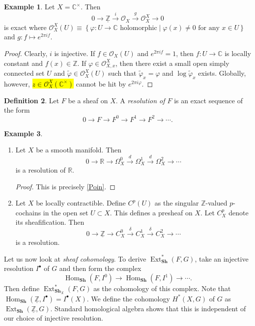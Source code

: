 \documentclass[10pt,letterpaper,cm]{nupset}
\theoremstyle{definition}
\newtheorem{definition}{Definition}[subsection]
\newtheorem{exmp}[definition]{Example}
\theoremstyle{theorem}
\theoremstyle{remark}
\newcommand{\C}{\mathbb C}
\newcommand{\R}{\mathbb{R}}
\newcommand{\Z}{\mathbb Z}
\newcommand{\1}{\mathbb{1}}
\newcommand{\0}{\vec 0}
\DeclareMathOperator{\ext}{Ext}
\DeclareMathOperator{\Hom}{Hom}
\begin{document}
\begin{exmp}
 Let $X = \C^{\times}$. Then $$ 0 \to \underline{\Z} \overset{i}{\longrightarrow} \mathcal{O}_X \overset{g}{\longrightarrow} \mathcal{O}_X^X \to 0$$ is exact where $\mathcal{O}_X^X(U) \equiv \left\{ \varphi : U \to \C \text{ holomorphic} \mid \varphi(x) \ne 0 \text{ for any } x\in U\right\}$ and $g : f \mapsto e^{2\pi i f}$.
\end{exmp}
\begin{proof}
Clearly, $i$ is injective. If $f \in \mathcal{O}_X(U)$ and $e^{2\pi i f} =1$, then $f : U \to \C$ is locally constant and $f(x) \in \Z$. If $\varphi \in \mathcal{O}_{X,x}^X$, then there exist a small open simply connected set $U$ and $\tilde{\varphi} \in \mathcal{O}_X^X(U)$ such that $\tilde{\varphi}_x = \varphi$ and $\log{\tilde{\varphi}_x}$ exists. Globally, however, \hl{$z\in \mathcal{O}_X^X(\C^{\times})$} cannot be hit by $e^{2\pi i \varphi}$.
\end{proof}

\begin{definition}
Let $F$ be a sheaf on $X$. A \textit{resolution of $F$} is an exact sequence of the form $$0 \to F \to F^0 \to F^1 \to F^2 \to \cdots .$$
\end{definition}

\pagebreak

\begin{exmp} $ $
\begin{enumerate}
\item Let $X$ be a smooth manifold. Then $$0 \to \R \to \Omega_X^0 \overset{d}{\longrightarrow} \Omega_X^1 \overset{d}{\longrightarrow} \Omega^2_X \to \cdots$$ is a resolution of $\R$.
\begin{proof}
This is precisely \cref{Poin}.
\end{proof}
\item Let $X$ be locally contractible. Define $C^p(U)$ as the singular $\Z$-valued $p$-cochains in the open set $U\subset X$. This defines a presheaf on $X$. Let $C^p_X$ denote its sheafification. Then $$0 \to \underline{\Z} \to C^0_X \overset{\delta}{\longrightarrow} C^1_X \overset{\delta}{\longrightarrow} C^2_X \to \cdots$$ is a resolution. 
\end{enumerate}
\end{exmp}

\medskip

Let us now look at \textit{sheaf cohomology}.
 To derive $\ext^{\ast}_{\mathbf{Sh}}(F, G)$, take an injective resolution $I^{\bullet}$ of $G$ and then form the complex $$\Hom_{\mathbf{Sh}}(F, I^0) \to \Hom_{\mathbf{Sh}}(F, I^1) \to \cdots.$$ Then define $\ext^{\ast}_{\mathbf{Sh}_{X}}(F, G)$ as the cohomology of this complex. Note that $\Hom_{\mathbf{Sh}}(\underline{\Z}, I^{\bullet}) = I^{\bullet}(X)$. We define the cohomology $H^{\ast}(X, G)$ of $G$ as $\ext_{\mathbf{Sh}}(\underline{\Z}, G)$.  Standard homological algebra shows that this is independent of our choice of injective resolution.  
\end{document}
